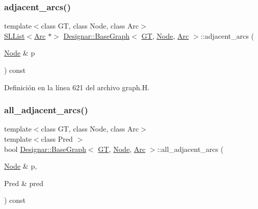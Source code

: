 \subsubsection{\texorpdfstring{adjacent\+\_\+arcs()}{adjacent\_arcs()}}
{\footnotesize\ttfamily template$<$class GT, class Node, class Arc$>$ \\
\hyperlink{class_designar_1_1_s_l_list}{S\+L\+List}$<$\hyperlink{namespace_designar_a3f55fb5513d62ff47cbc8f72b8e95d6f}{Arc} $\ast$$>$ \hyperlink{class_designar_1_1_base_graph}{Designar\+::\+Base\+Graph}$<$ \hyperlink{demo-buildgraph_8_c_a3001c40d2c31ca87ed96cd7d1334a55e}{GT}, \hyperlink{namespace_designar_a5af326c65aa2bd26b26c410f2030d09e}{Node}, \hyperlink{namespace_designar_a3f55fb5513d62ff47cbc8f72b8e95d6f}{Arc} $>$\+::adjacent\+\_\+arcs (\begin{DoxyParamCaption}\item[{\hyperlink{namespace_designar_a5af326c65aa2bd26b26c410f2030d09e}{Node} \&}]{p }\end{DoxyParamCaption}) const\hspace{0.3cm}{\ttfamily [inline]}}



Definición en la línea 621 del archivo graph.\+H.

\mbox{\label{class_designar_1_1_base_graph_af7a57a1088105a79466546620bf830b3}} 
\subsubsection{\texorpdfstring{all\+\_\+adjacent\+\_\+arcs()}{all\_adjacent\_arcs()}\hspace{0.1cm}{\footnotesize\ttfamily [1/2]}}
{\footnotesize\ttfamily template$<$class GT, class Node, class Arc$>$ \\
template$<$class Pred $>$ \\
bool \hyperlink{class_designar_1_1_base_graph}{Designar\+::\+Base\+Graph}$<$ \hyperlink{demo-buildgraph_8_c_a3001c40d2c31ca87ed96cd7d1334a55e}{GT}, \hyperlink{namespace_designar_a5af326c65aa2bd26b26c410f2030d09e}{Node}, \hyperlink{namespace_designar_a3f55fb5513d62ff47cbc8f72b8e95d6f}{Arc} $>$\+::all\+\_\+adjacent\+\_\+arcs (\begin{DoxyParamCaption}\item[{\hyperlink{namespace_designar_a5af326c65aa2bd26b26c410f2030d09e}{Node} \&}]{p,  }\item[{Pred \&}]{pred }\end{DoxyParamCaption}) const\hspace{0.3cm}{\ttfamily [inline]}}



